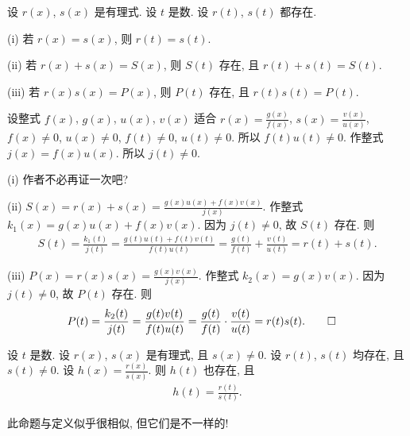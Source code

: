 \begin{proposition}
    设 $r(x)$, $s(x)$ 是有理式. 设 $t$ 是数. 设 $r(t)$, $s(t)$ 都存在.

    (i) 若 $r(x) = s(x)$, 则 $r(t) = s(t)$.

    (ii) 若 $r(x) + s(x) = S(x)$, 则 $S(t)$ 存在, 且 $r(t) + s(t) = S(t)$.

    (iii) 若 $r(x) s(x) = P(x)$, 则 $P(t)$ 存在, 且 $r(t) s(t) = P(t)$.
\end{proposition}

\begin{pf}
    设整式 $f(x)$, $g(x)$, $u(x)$, $v(x)$ 适合 $r(x) = \frac{g(x)}{f(x)}$, $s(x) = \frac{v(x)}{u(x)}$, $f(x) \neq 0$, $u(x) \neq 0$, $f(t) \neq 0$, $u(t) \neq 0$. 所以 $f(t) u(t) \neq 0$. 作整式 $j(x) = f(x) u(x)$. 所以 $j(t) \neq 0$.

    (i) 作者不必再证一次吧?

    (ii) $S(x) = r(x) + s(x) = \frac{g(x) u(x) + f(x) v(x)}{j(x)}$. 作整式 $k_1 (x) = g(x) u(x) + f(x) v(x)$. 因为 $j(t) \neq 0$, 故 $S(t)$ 存在. 则
    \begin{align*}
        S(t) = \frac{k_1 (t)}{j(t)} = \frac{g(t) u(t) + f(t) v(t)}{f(t) u(t)} = \frac{g(t)}{f(t)} + \frac{v(t)}{u(t)} = r(t) + s(t).
    \end{align*}

    (iii) $P(x) = r(x) s(x) = \frac{g(x) v(x)}{j(x)}$. 作整式 $k_2 (x) = g(x) v(x)$. 因为 $j(t) \neq 0$, 故 $P(t)$ 存在. 则
    \begin{align*}
         & P(t) = \frac{k_2 (t)}{j(t)} = \frac{g(t) v(t)}{f(t) u(t)} = \frac{g(t)}{f(t)} \cdot \frac{v(t)}{u(t)} = r(t) s(t). \qedhere
    \end{align*}
\end{pf}

\begin{proposition}
    设 $t$ 是数. 设 $r(x)$, $s(x)$ 是有理式, 且 $s(x) \neq 0$. 设 $r(t)$, $s(t)$ 均存在, 且 $s(t) \neq 0$. 设 $h(x) = \frac{r(x)}{s(x)}$. 则 $h(t)$ 也存在, 且
    \begin{align*}
        h(t) = \frac{r(t)}{s(t)}.
    \end{align*}
\end{proposition}

\begin{remark}
    此命题与定义似乎很相似, 但它们是不一样的!
\end{remark}

